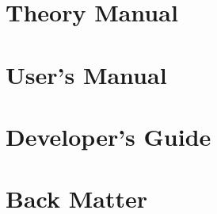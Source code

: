 \documentclass[pdf,11pt]{SANDreport}
\begin{document}
%
\setcounter{secnumdepth}{3}
\SANDmain %

\cleardoublepage
\part{Theory Manual}

\cleardoublepage






\cleardoublepage
\part{User's Manual}

\cleardoublepage



\cleardoublepage
\part{Developer's Guide}

\cleardoublepage


\cleardoublepage
\part{Back Matter}

\cleardoublepage


%
\cleardoublepage
{}




%
%     

%


\cleardoublepage
{}
\printindex{}



\end{document}
